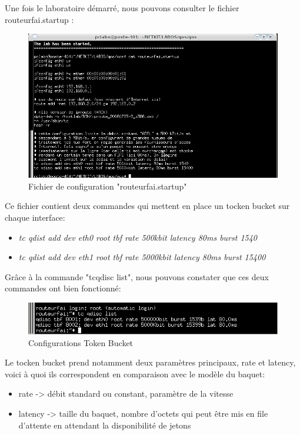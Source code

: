 \documentclass{article}
\begin{document}

\newpage
Une fois le laboratoire démarré, nous pouvons consulter le fichier routeurfai.startup :
\begin{figure}[h]
  \centering
  \includegraphics[width=\linewidth]{./captures/2-RouteurfaiStartup.png}
  \caption{Fichier de configuration "routeurfai.startup"}
  \label{fig:token-bucket}
\end{figure}

Ce fichier contient deux commandes qui mettent en place un tocken bucket sur chaque interface:
\begin{itemize}
\item \textit{tc qdist add dev eth0 root tbf rate 500kbit latency 80ms burst 1540}
\item \textit{tc qdist add dev eth1 root tbf rate 5000kbit latency 80ms burst 15400}
\end{itemize}

Grâce à la commande "tcqdisc list", nous pouvons constater que ces deux commandes ont bien fonctionné:
\begin{figure}[h]
  \centering
  \includegraphics[width=\linewidth]{./captures/3-TokenBucket.png}
  \caption{Configurations Token Bucket}
  \label{fig:token-bucket}
\end{figure}

Le tocken bucket prend notamment deux paramètres principaux, rate et latency, voici à quoi ils correspondent en comparaison avec le modèle du baquet:
\begin{itemize}
\item rate -> débit standard ou constant, paramètre de la vitesse
\item latency -> taille du baquet, nombre d’octets qui peut être mis en file d’attente en attendant la disponibilité de jetons
\end{itemize}
\end{document}
